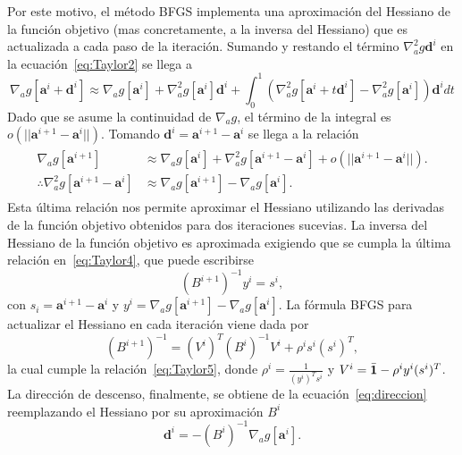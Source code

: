 Por este motivo, el método BFGS implementa una aproximación del Hessiano de la función objetivo (mas concretamente, 
a la inversa del Hessiano) que 
es actualizada a cada paso de la iteración. Sumando y restando el término $ \nabla_a^2 g \mathbf{d}^i$ en la ecuación~\eqref{eq:Taylor2} se llega a
\begin{equation}
\nabla_a g[\mathbf{a}^i+ \mathbf{d}^i]\approx \nabla_a g[\mathbf{a}^i]+ \nabla_a^2 g[\mathbf{a}^i]\mathbf{d}^i + \int_0^1   \left( \nabla_a^2 g[\mathbf{a}^i+t\mathbf{d}^i]-\nabla_a^2 g[\mathbf{a}^i] \right)\mathbf{d}^idt
\label{eq:Taylor3}
\end{equation}
Dado que se asume la continuidad de $\nabla_a g$, el término de la integral 
es $o(||\mathbf{a}^{i+1}-\mathbf{a}^{i}||)$. Tomando $\mathbf{d}^i=\mathbf{a}^{i+1}-\mathbf{a}^{i}$ se llega a la relación
\begin{equation}
\begin{split}
\begin{aligned}
\nabla_a g[\mathbf{a}^{i+1}] &\approx \nabla_a g[\mathbf{a}^i]+ \nabla_a^2 g[\mathbf{a}^{i+1}-\mathbf{a}^i]  + o(||\mathbf{a}^{i+1}-\mathbf{a}^{i}||).\\
\therefore \nabla_a^2 g[\mathbf{a}^{i+1}-\mathbf{a}^i]& \approx \nabla_a g[\mathbf{a}^{i+1}]  - \nabla_a g[\mathbf{a}^{i}].
\end{aligned}
\end{split}
\label{eq:Taylor4}
\end{equation}
Esta última relación nos permite aproximar el Hessiano utilizando las derivadas de 
la función objetivo obtenidos para dos iteraciones sucevias. 
La inversa del Hessiano de la función objetivo es aproximada exigiendo que se cumpla la última relación en~\eqref{eq:Taylor4}, que puede escribirse 
\begin{equation}
(B^{i+1})^{-1}y^i=s^i,
\label{eq:Taylor5}
\end{equation}
con $s_i=  \mathbf{a}^{i+1}-\mathbf{a}^{i}$ y $y^i=\nabla_a g[\mathbf{a}^{i+1}]  - \nabla_a g[\mathbf{a}^{i}]$. La fórmula BFGS para actualizar el Hessiano en cada iteración viene dada por~\cite{Nocedal2006}
\begin{equation}
(B^{i+1})^{-1}=(V^i)^T (B^{i})^{-1}V^i + \rho^i s^i (s^i)^T  ,
\label{eq:HBFGS}
\end{equation}
la cual cumple la relación~\eqref{eq:Taylor5}, donde $\rho^i=\frac{1}{(y^i)^T s^i}$ 
y $V^i=\bar{\mathbf{1}} - \rho^i y^i (s^i)^T$. 
La dirección de descenso, finalmente, se obtiene de la ecuación~\eqref{eq:direccion} reemplazando 
el Hessiano por su aproximación $B^i$
\begin{equation}
\mathbf{d}^{i}=-(B^{i})^{-1} \nabla_a g[\mathbf{a}^i]. 
\label{eq:HBFGS}
\end{equation}

